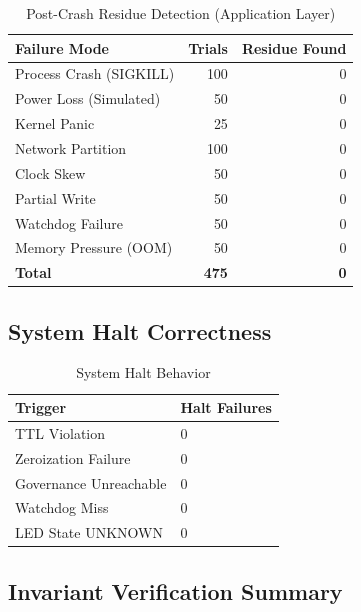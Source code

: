 \documentclass[conference]{IEEEtran}
\begin{document}
\begin{table}[h]
\caption{Post-Crash Residue Detection (Application Layer)}
\centering
\begin{tabular}{l r r}
\toprule
\textbf{Failure Mode} & \textbf{Trials} & \textbf{Residue Found} \\
\midrule
Process Crash (SIGKILL) & 100 & 0 \\
Power Loss (Simulated) & 50 & 0 \\
Kernel Panic & 25 & 0 \\
Network Partition & 100 & 0 \\
Clock Skew & 50 & 0 \\
Partial Write & 50 & 0 \\
Watchdog Failure & 50 & 0 \\
Memory Pressure (OOM) & 50 & 0 \\
\textbf{Total} & \textbf{475} & \textbf{0} \\
\bottomrule
\end{tabular}
\label{tab:residue}
\end{table}

\subsection{System Halt Correctness}

\begin{table}[h]
\caption{System Halt Behavior}
\centering
\begin{tabular}{l l}
\toprule
\textbf{Trigger} & \textbf{Halt Failures} \\
\midrule
TTL Violation & 0 \\
Zeroization Failure & 0 \\
Governance Unreachable & 0 \\
Watchdog Miss & 0 \\
LED State UNKNOWN & 0 \\
\bottomrule
\end{tabular}
\label{tab:halt}
\end{table}

\subsection{Invariant Verification Summary}
\end{document}
